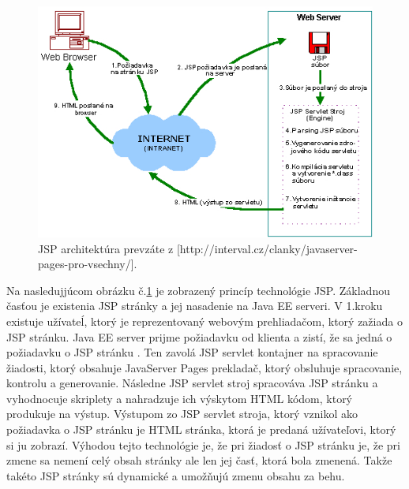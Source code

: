 \begin{figure}[htb]

\begin{center}

\includegraphics[scale=0.5]{architecture.jpg} 
\caption{JSP architektúra  prevzáte z [http://interval.cz/clanky/javaserver-pages-pro-vsechny/]. }
\label{jsp}

\end{center}

\end{figure}
Na nasledujjúcom obrázku č.\ref{jsp} je zobrazený princíp technológie JSP. Základnou časťou je existenia JSP stránky a jej nasadenie na Java EE serveri. V 1.kroku existuje užívateĺ, ktorý je reprezentovaný webovým prehliadačom, ktorý zažiada o JSP stránku. Java EE server prijme požiadavku od klienta a zistí, že sa jedná o požiadavku o JSP stránku . Ten zavolá JSP servlet kontajner na spracovanie žiadosti, ktorý obsahuje JavaServer Pages prekladač, ktorý obsluhuje spracovanie, kontrolu a generovanie. Následne JSP servlet stroj spracováva JSP stránku a vyhodnocuje skriplety a nahradzuje ich výskytom HTML kódom, ktorý produkuje na výstup. Výstupom zo JSP servlet stroja, ktorý vznikol ako požiadavka o JSP stránku je HTML stránka, ktorá je predaná užívateľovi, ktorý si ju zobrazí. Výhodou tejto technológie je, že pri žiadosť o JSP stránku je, že pri zmene sa nemení celý obsah stránky ale len jej časť, ktorá bola zmenená. Takže takéto JSP stránky sú dynamické a umožňujú zmenu obsahu za behu.



